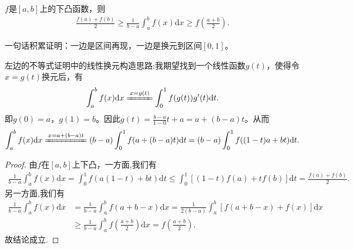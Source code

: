 \documentclass[../../main.tex]{subfiles}
\begin{document}
\begin{theorem}[Hadamard不等式]\label{theorem:Hadamard不等式}
\(f\)是\([a,b]\)上的下凸函数，则
\begin{align*}
\frac{f(a)+f(b)}{2} \geqslant \frac{1}{b - a}\int_{a}^{b}f(x)\mathrm{d}x \geqslant f\left(\frac{a + b}{2}\right).
\end{align*} 
\end{theorem}
\begin{note}
一句话积累证明：一边是区间再现，一边是换元到区间\([0,1]\)。
\end{note}
\begin{remark}
左边的不等式证明中的线性换元构造思路:我期望找到一个线性函数$g(t)$，使得令$x = g(t)$换元后，有
\begin{align*}
\int_a^b f(x) \mathrm{d}x \xlongequal{x = g(t)} \int_0^1 f(g(t))g'(t) \mathrm{d}t.
\end{align*}
即$g(0) = a$，$g(1) = b$。因此$g(t) = \frac{b - a}{1 - 0}t + a = a + (b - a)t$。从而
\begin{align*}
\int_a^b f(x) \mathrm{d}x \xlongequal{x = a + (b - a)t} (b - a)\int_0^1 f(a + (b - a)t) \mathrm{d}t = (b - a)\int_0^1 f((1 - t)a + bt) \mathrm{d}t.
\end{align*} 
\end{remark}
\begin{proof}
由$f$在$[a,b]$上下凸，一方面,我们有
\begin{align*}
\frac{1}{b - a}\int_{a}^{b}f(x)\mathrm{d}x = \int_{0}^{1}f(a(1 - t)+bt)\mathrm{d}t \leqslant \int_{0}^{1}[(1 - t)f(a)+tf(b)]\mathrm{d}t = \frac{f(a)+f(b)}{2}.
\end{align*}
另一方面,我们有
\begin{align*}
\frac{1}{b - a}\int_{a}^{b}f(x)\mathrm{d}x &= \frac{1}{b - a}\int_{a}^{b}f(a + b - x)\mathrm{d}x
= \frac{1}{2(b - a)}\int_{a}^{b}[f(a + b - x)+f(x)]\mathrm{d}x\\
&\geqslant \frac{1}{b - a}\int_{a}^{b}f\left(\frac{a + b}{2}\right)\mathrm{d}x
= f\left(\frac{a + b}{2}\right).
\end{align*}
故结论成立.

\end{proof}
\end{document}

